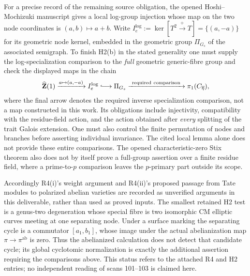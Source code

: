 For a precise record of the remaining source obligation, the opened
Hoshi--Mochizuki manuscript
\cite[Definition 2.10(iv) and Lemma 2.11(ii),(iii)]{B_HoshiMochizuki2011}
gives a local log-group injection whose map on the two node coordinates
is $(a,b)\mapsto a+b$. Write
$I_e^{\log}:=\ker[T^2\xrightarrow{+}T]=\{(a,-a)\}$ for its
geometric node kernel, embedded in the geometric group $\Pi_{G_s}$ of
the associated semigraph. To finish H2(b) in the stated generality one must
supply the log-specialization comparison to the \emph{full} geometric
generic-fibre group and check the displayed maps in the chain
\[
 \widehat{\mathbf Z}(1)
 \xrightarrow{a\mapsto(a,-a)} I_e^{\log}
 \lhook\joinrel\longrightarrow\Pi_{G_s}
 \xrightarrow{\ \mathrm{required\ comparison}\ }
 \pi_1(C_{\overline\eta}),
\]
where the final arrow denotes the required inverse specialization
comparison, not a map constructed in this work. Its obligations include
injectivity, compatibility with the residue-field action,
and the action obtained after \emph{every} splitting of the trait
Galois extension. One must also control the finite permutation of nodes
and branches before asserting individual invariance. The cited local
lemma alone does not provide these entire comparisons. The opened
characteristic-zero Stix theorem also does not by itself prove a
full-group assertion over a finite residue field, where a prime-to-$p$
comparison leaves the $p$-primary part outside its scope.

Accordingly R4(i)'s weight argument and R4(ii)'s proposed passage from
Tate modules to polarized abelian varieties are recorded as unverified
arguments in this deliverable, rather than used as proved inputs. The
smallest retained H2 test is a genus-two degeneration whose special
fibre is two isomorphic CM elliptic curves meeting at one separating
node. Under a surface marking the separating cycle is a commutator
$[a_1,b_1]$, whose image under the actual abelianization map
$\pi\to\pi^{\mathrm{ab}}$ is zero. Thus the abelianized calculation
does not detect that candidate cycle; its global cyclotomic
normalization is exactly the additional assertion requiring the
comparisons above. This status refers to the attached R4 and H2
entries; no independent reading of scans 101--103 is claimed here.
